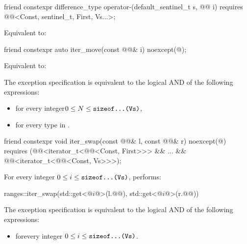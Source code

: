 \begin{itemdecl}
friend constexpr difference_type operator-(default_sentinel_t s, @@ i)
  requires @@<Const, sentinel_t, First, Vs...>;
\end{itemdecl}

\begin{itemdescr}
\pnum
\effects
Equivalent to: 
\end{itemdescr}

\begin{itemdecl}
friend constexpr auto iter_move(const @@& i) noexcept(@\seebelow@);
\end{itemdecl}

\begin{itemdescr}
\pnum
\effects
Equivalent to: 

\pnum
\remarks
The exception specification is equivalent to
the logical AND of the following expressions:
\begin{itemize}
\item
{}
for every integer\newline $0 \le N \le \texttt{sizeof...(Vs)}$,
\item
{}\newline
for every type  in .
\end{itemize}
\end{itemdescr}

\begin{itemdecl}
friend constexpr void iter_swap(const @@& l, const @@& r) noexcept(@\seebelow@)
  requires (@@<iterator_t<@@<Const, First>>> && ... &&
        @@<iterator_t<@@<Const, Vs>>>);
\end{itemdecl}

\begin{itemdescr}
\pnum
\effects
For every integer $0 \le i \le \texttt{sizeof...(Vs)}$, performs:
\begin{codeblock}
ranges::iter_swap(std::get<@$i$@>(l.@@), std::get<@$i$@>(r.@@))
\end{codeblock}

\pnum
\remarks
The exception specification is equivalent to the logical AND of the following expressions:
\begin{itemize}
\item
{}
for\newline every integer $0 \le i \le \texttt{sizeof...(Vs)}$.
\end{itemize}
\end{itemdescr}

